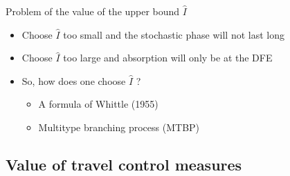 \documentclass[aspectratio=169]{beamer}\usepackage[]{graphicx}\usepackage[]{xcolor}
\begin{document}

\begin{frame}{Problem of the value of the upper bound $\hat I$}
  \begin{itemize}
    \item Choose $\hat I$ too small and the stochastic phase will not last long
    \vfill
    \item Choose $\hat I$ too large and absorption will only be at the DFE
    \vfill
    \item So, how does one choose $\hat I$ ?
    \begin{itemize}
      \item A formula of Whittle (1955) \nocite{whittle1955}
      \item Multitype branching process (MTBP)
    \end{itemize}
  \end{itemize}
\end{frame}

\subsection{Value of travel control measures}
\end{document}
